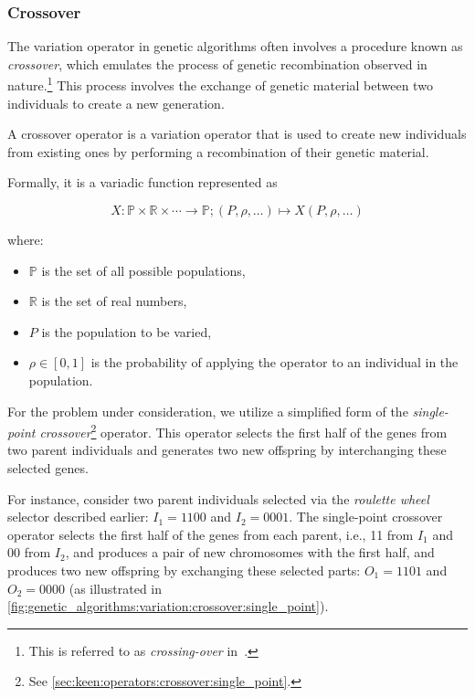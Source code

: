 \subsubsection{Crossover}
\label{sec:bg:ga:var:cx}
  The variation operator in genetic algorithms often involves a procedure known as \emph{crossover},
  which emulates the process of genetic recombination observed in nature.\footnote{
    This is referred to as \emph{crossing-over} 
    in~\autocite{hollandAdaptationNaturalArtificial1992a}.
  }
  This process involves the exchange of genetic material between two individuals to create a new 
  generation.

  \begin{definition}
  \label{def:crossover_operator}
    A crossover operator is a variation operator that is used to create new individuals from 
    existing ones by performing a recombination of their genetic material.

    Formally, it is a variadic function represented as 
    
    \[
      X : \mathbb{P} \times \mathbb{R} \times \cdots \to \mathbb{P};
      (P, \rho, \dots) \mapsto X(P, \rho, \dots)
    \]
    
    where:

    \begin{itemize}
      \item \(\mathbb{P}\) is the set of all possible populations,
      \item \(\mathbb{R}\) is the set of real numbers,
      \item \(P\) is the population to be varied,
      \item \(\rho \in [0, 1]\) is the probability of applying the operator to an individual in the 
        population.
    \end{itemize}

  \end{definition}

  For the problem under consideration, we utilize a simplified form of the \emph{single-point 
  crossover}\footnote{See \vref{sec:keen:operators:crossover:single_point}.} operator. 
  This operator selects the first half of the genes from two parent individuals and generates two 
  new offspring by interchanging these selected genes.
  
  For instance, consider two parent individuals selected via the \emph{roulette wheel} selector 
  described earlier: \(I_1 = 1100\) and \(I_2 = 0001\).
  The single-point crossover operator selects the first half of the genes from each parent, i.e., 11
  from \(I_1\) and 00 from \(I_2\), and produces a pair of new chromosomes with the first half, and 
  produces two new offspring by exchanging these selected parts: \(O_1 = 1101\) and \(O_2 = 0000\) 
  (as illustrated in \vref{fig:genetic_algorithms:variation:crossover:single_point}).


